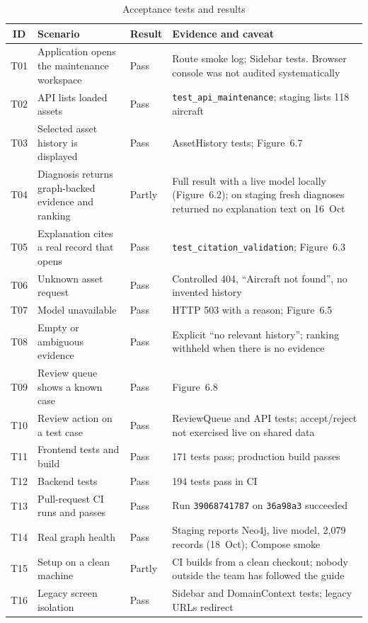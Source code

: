 \begin{table}[H]
\centering
\caption{Acceptance tests and results}
\label{tab:acceptance}
\small
\begin{tabularx}{\textwidth}{@{}c >{\raggedright\arraybackslash}p{} >{\raggedright\arraybackslash}p{} L@{}}
\toprule
ID & Scenario & Result & Evidence and caveat \\
\midrule
T01 & Application opens the maintenance workspace & Pass & Route smoke log; Sidebar tests. Browser console was not audited systematically \\
T02 & API lists loaded assets & Pass & \texttt{test\_api\_maintenance}; staging lists 118 aircraft \\
T03 & Selected asset history is displayed & Pass & AssetHistory tests; Figure~6.7 \\
T04 & Diagnosis returns graph-backed evidence and ranking & Partly & Full result with a live model locally (Figure~6.2); on staging fresh diagnoses returned no explanation text on 16~Oct \\
T05 & Explanation cites a real record that opens & Pass & \texttt{test\_citation\_validation}; Figure~6.3 \\
T06 & Unknown asset request & Pass & Controlled 404, ``Aircraft not found'', no invented history \\
T07 & Model unavailable & Pass & HTTP 503 with a reason; Figure~6.5 \\
T08 & Empty or ambiguous evidence & Pass & Explicit ``no relevant history''; ranking withheld when there is no evidence \\
T09 & Review queue shows a known case & Pass & Figure~6.8 \\
T10 & Review action on a test case & Pass & ReviewQueue and API tests; accept/reject not exercised live on shared data \\
T11 & Frontend tests and build & Pass & 171 tests pass; production build passes \\
T12 & Backend tests & Pass & 194 tests pass in CI \\
T13 & Pull-request CI runs and passes & Pass & Run \texttt{39068741787} on \texttt{36a98a3} succeeded \\
T14 & Real graph health & Pass & Staging reports Neo4j, live model, 2{,}079 records (18~Oct); Compose smoke \\
T15 & Setup on a clean machine & Partly & CI builds from a clean checkout; nobody outside the team has followed the guide \\
T16 & Legacy screen isolation & Pass & Sidebar and DomainContext tests; legacy URLs redirect \\
\bottomrule
\end{tabularx}
\end{table}
